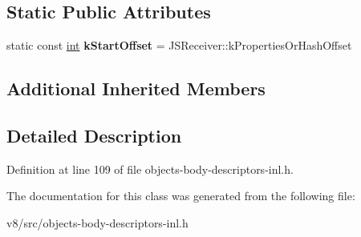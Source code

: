 \subsection*{Static Public Attributes}
\begin{DoxyCompactItemize}
\item 
\mbox{\label{classv8_1_1internal_1_1JSObject_1_1BodyDescriptor_a55fc9a8e473282b7c45fe811eca4da3c}} 
static const \mbox{\hyperlink{classint}{int}} {\bfseries k\+Start\+Offset} = J\+S\+Receiver\+::k\+Properties\+Or\+Hash\+Offset
\end{DoxyCompactItemize}
\subsection*{Additional Inherited Members}


\subsection{Detailed Description}


Definition at line 109 of file objects-\/body-\/descriptors-\/inl.\+h.



The documentation for this class was generated from the following file\+:\begin{DoxyCompactItemize}
\item 
v8/src/objects-\/body-\/descriptors-\/inl.\+h\end{DoxyCompactItemize}
